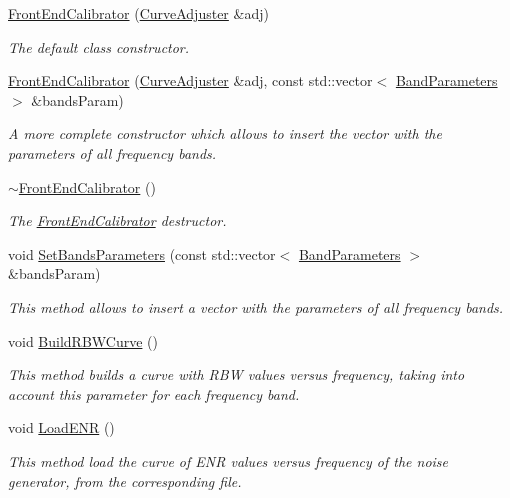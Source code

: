 \begin{DoxyCompactItemize}
\item 
\hyperlink{classFrontEndCalibrator_abff839c00a46ff060c1d66fc3b151d65}{Front\+End\+Calibrator} (\hyperlink{classCurveAdjuster}{Curve\+Adjuster} \&adj)
\begin{DoxyCompactList}\small\item\em The default class constructor. \end{DoxyCompactList}\item 
\hyperlink{classFrontEndCalibrator_a026150fceb18ec9601cbc698e04f39cc}{Front\+End\+Calibrator} (\hyperlink{classCurveAdjuster}{Curve\+Adjuster} \&adj, const std\+::vector$<$ \hyperlink{structBandParameters}{Band\+Parameters} $>$ \&bands\+Param)
\begin{DoxyCompactList}\small\item\em A more complete constructor which allows to insert the vector with the parameters of all frequency bands. \end{DoxyCompactList}\item 
\hyperlink{classFrontEndCalibrator_a8744dd099d7e7ba6f04be3505cd4a607}{$\sim$\+Front\+End\+Calibrator} ()
\begin{DoxyCompactList}\small\item\em The {\itshape \hyperlink{classFrontEndCalibrator}{Front\+End\+Calibrator}} destructor. \end{DoxyCompactList}\item 
void \hyperlink{classFrontEndCalibrator_a6fcf8e8343878614d1b03910bb97a3d6}{Set\+Bands\+Parameters} (const std\+::vector$<$ \hyperlink{structBandParameters}{Band\+Parameters} $>$ \&bands\+Param)
\begin{DoxyCompactList}\small\item\em This method allows to insert a vector with the parameters of all frequency bands. \end{DoxyCompactList}\item 
void \hyperlink{classFrontEndCalibrator_a97e4fb11d9160b4e56f5f2e2ddcf41a7}{Build\+R\+B\+W\+Curve} ()
\begin{DoxyCompactList}\small\item\em This method builds a curve with R\+BW values versus frequency, taking into account this parameter for each frequency band. \end{DoxyCompactList}\item 
void \hyperlink{classFrontEndCalibrator_af166e90f4fe0dfd7cdf825b88d33a479}{Load\+E\+NR} ()
\begin{DoxyCompactList}\small\item\em This method load the curve of E\+NR values versus frequency of the noise generator, from the corresponding file. \end{DoxyCompactList}\item 

\end{DoxyCompactItemize}
